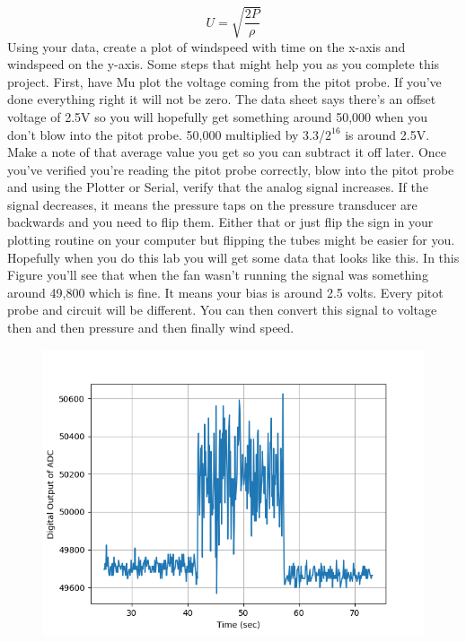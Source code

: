 \begin{equation}
U = \sqrt{\frac{2P}{\rho}}
\end{equation}
Using your data, create a plot of windspeed with time on the x-axis and windspeed on the y-axis. Some steps that might help you as you complete this project. First, have Mu plot the voltage coming from the pitot probe. If you’ve done everything right it will not be zero. The data sheet says there’s an offset voltage of 2.5V so you will hopefully get something around 50,000 when you don’t blow into the pitot probe. 50,000 multiplied by 3.3/$2^16$ is around 2.5V. Make a note of that average value you get so you can subtract it off later. Once you’ve verified you’re reading the pitot probe correctly, blow into the pitot probe and using the Plotter or Serial, verify that the analog signal increases. If the signal decreases, it means the pressure taps on the pressure transducer are backwards and you need to flip them. Either that or just flip the sign in your plotting routine on your computer but flipping the tubes might be easier for you. Hopefully when you do this lab you will get some data that looks like this. In this Figure you’ll see that when the fan wasn’t running the signal was something around 49,800 which is fine. It means your bias is around 2.5 volts. Every pitot probe and circuit will be different. You can then convert this signal to voltage then and then pressure and then finally wind speed.
\begin{figure}[H]
  \begin{center}
    \includegraphics[width=\textwidth]{Figures/pitot_probe_data.png}
  \end{center}
\end{figure}
